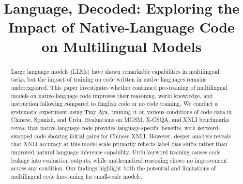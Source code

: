 \documentclass[conference]{IEEEtran}
\begin{document}
\title{Language, Decoded: Exploring the Impact of Native-Language Code on Multilingual Models}

\author{
\and
{}
\and
{}
\and
{}
\and
{}
\and
{}
\and
{}
\and
{}
}

\maketitle

\begin{abstract}
Large language models (LLMs) have shown remarkable capabilities in multilingual tasks, but the impact of training on code written in native languages remains underexplored. This paper investigates whether continued pre-training of multilingual models on native-language code improves their reasoning, world knowledge, and instruction following compared to English code or no code training. We conduct a systematic experiment using Tiny Aya, training it on various conditions of code data in Chinese, Spanish, and Urdu. Evaluations on MGSM, X-CSQA, and XNLI benchmarks reveal that native-language code provides language-specific benefits, with keyword-swapped code showing initial gains for Chinese XNLI. However, deeper analysis reveals that XNLI accuracy at this model scale primarily reflects label bias shifts rather than improved natural language inference capability. Urdu keyword training causes code leakage into evaluation outputs, while mathematical reasoning shows no improvement across any condition. Our findings highlight both the potential and limitations of multilingual code fine-tuning for small-scale models.
\end{abstract}
\end{document}
